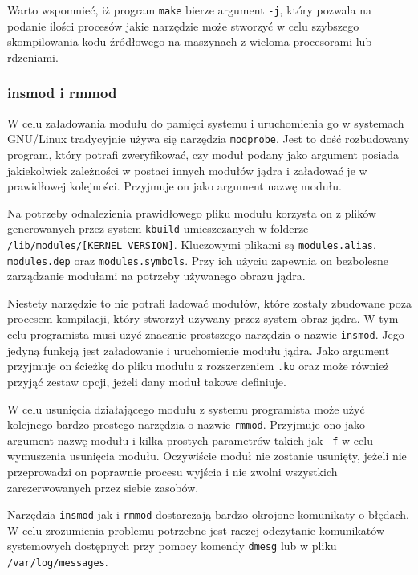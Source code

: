 \documentclass[11pt]{scrartcl}
\begin{document}
Warto wspomnieć, iż program \texttt{make} bierze argument \texttt{-j}, który pozwala na podanie ilości procesów jakie narzędzie może stworzyć w celu szybszego skompilowania kodu źródłowego na maszynach z wieloma procesorami lub rdzeniami.

\subsubsection{insmod i rmmod}

W celu załadowania modułu do pamięci systemu i uruchomienia go w systemach GNU/Linux tradycyjnie używa się narzędzia \texttt{modprobe}. Jest to dość rozbudowany program, który potrafi zweryfikować, czy moduł podany jako argument posiada jakiekolwiek zależności w postaci innych modułów jądra i załadować je w prawidłowej kolejności. Przyjmuje on jako argument nazwę modułu.

Na potrzeby odnalezienia prawidłowego pliku modułu korzysta on z plików generowanych przez system \texttt{kbuild} umieszczanych w folderze \texttt{/lib/modules/{[}KERNEL\_VERSION{]}}. Kluczowymi plikami są \texttt{modules.alias}, \texttt{modules.dep} oraz \texttt{modules.symbols}. Przy ich użyciu zapewnia on bezbolesne zarządzanie modułami na potrzeby używanego obrazu jądra.

Niestety narzędzie to nie potrafi ładować modułów, które zostały zbudowane poza procesem kompilacji, który stworzył używany przez system obraz jądra. W tym celu programista musi użyć znacznie prostszego narzędzia o nazwie \texttt{insmod}. Jego jedyną funkcją jest załadowanie i uruchomienie modułu jądra. Jako argument przyjmuje on ścieżkę do pliku modułu z rozszerzeniem \texttt{.ko} oraz może również przyjąć zestaw opcji, jeżeli dany moduł takowe definiuje.

W celu usunięcia działającego modułu z systemu programista może użyć kolejnego bardzo prostego narzędzia o nazwie \texttt{rmmod}. Przyjmuje ono jako argument nazwę modułu i kilka prostych parametrów takich jak \texttt{-f} w celu wymuszenia usunięcia modułu. Oczywiście moduł nie zostanie usunięty, jeżeli nie przeprowadzi on poprawnie procesu wyjścia i nie zwolni wszystkich zarezerwowanych przez siebie zasobów.

Narzędzia \texttt{insmod} jak i \texttt{rmmod} dostarczają bardzo okrojone komunikaty o błędach. W celu zrozumienia problemu potrzebne jest raczej odczytanie komunikatów systemowych dostępnych przy pomocy komendy \texttt{dmesg} lub w pliku \texttt{/var/log/messages}.
\end{document}
